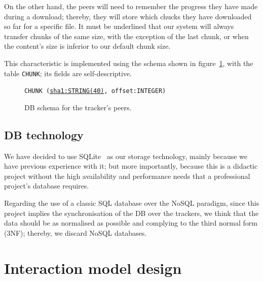 \documentclass[twoside,a4paper,10pt]{article}
\begin{document}
On the other hand, the peers will need to remember the
progress they have made during a download; thereby, they will store which chucks
they have downloaded so far for a specific file. It must be underlined that our
system will always transfer chunks of the same size, with the exception of the
last chunk, or when the content's size is inferior to our default chunk size.

This characteristic is implemented using the schema shown in
figure~\ref{fig:schema-P}, with the table \texttt{CHUNK}; its
fields are self-descriptive.

\begin{figure}[h]
  
  \texttt{CHUNK (\underline{sha1:STRING(40)}, offset:INTEGER)}
  
  \centering
  \caption{\label{fig:schema-P}DB schema for the tracker's peers.}
\end{figure}

\subsection{DB technology}

We have decided to use SQLite~\cite{sqlite} as our storage technology,
mainly because we have previous experience with it; but more importantly,
because this is a didactic project without the high availability and performance
needs that a professional project's database requires.

Regarding the use of a classic SQL database over the NoSQL paradigm, since
this project implies the synchronisation of the DB over the trackers, we think
that the data should be as normalised as possible and complying to the third
normal form (3NF); thereby, we discard NoSQL databases.

\section{Interaction model design}
\end{document}
